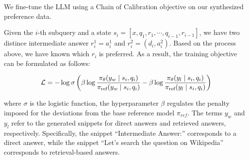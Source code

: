 We fine-tune the LLM using a Chain of Calibration objective on our synthesized preference data. 

Given the $i$-th subquery and a state $s_i = [x,q_1, r_1, \cdots, q_{i-1}, r_{i-1}]$, we have two distince intermediate answer $r_i^1 = a_i^1$ and $r_i^2 = (d_i, a_i^2)$. Based on the process above, we have known which $r_i$ is preferred.  As a result, the training objective can be formulated as follows:


\begin{small}
\begin{equation}
\mathcal{L} = 
-  \log \sigma \left( \beta \log \frac{\pi_{\theta}(y_w \mid s_i, q_i)}{\pi_{\text{ref}}(y_w \mid s_i, q_i)} - \beta \log \frac{\pi_{\theta}(y_l \mid s_i, q_i)}{\pi_{\text{ref}}(y_l \mid s_i, q_i)} \right)  \notag
\end{equation}
\end{small}
where $\sigma$ is the logistic function, the hyperparameter $\beta$ regulates the penalty imposed for the deviations
from the base reference model $\pi_{ref}$.
The terms \( y_w \) and \( y_l \) refer to the generated snippets for direct answers and retrieved answers, respectively. Specifically, the snippet ``Intermediate Answer:'' corresponds to a direct answer, while the snippet ``Let's search the question on Wikipedia'' corresponds to retrieval-based answers.



